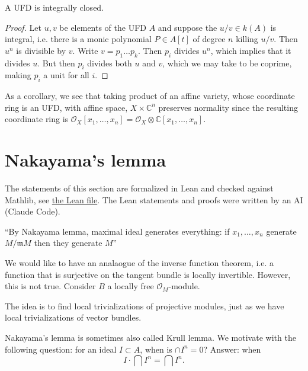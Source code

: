 \begin{proposition}
\label{proposition-ufd-integrally-closed}
A UFD is integrally closed.
\end{proposition}

\begin{proof}
Let $u,v$ be elements of the UFD $A$
and suppose the $u/v \in k(A)$ is integral,
i.e. there is a monic polynomial
$P \in A[t]$ of degree $n$ killing $u/v$.
Then $u^n$ is divisible by $v$.
Write $v=p_1…p_k$.
Then $p_i$ divides $u^n$,
which implies that it divides $u$.
But then $p_i$ divides both $u$ and $v$,
which we may take to be coprime, making
$p_i$ a unit for all $i$.
\end{proof}


\noindent
As a corollary, we see that taking product of
an affine variety, whose coordinate ring is
an UFD, with affine space, $X \times
\mathbb{C}^n$ preserves normality since the
resulting coordinate ring is
$\mathcal{O}_X[x_1,…,x_n]=\mathcal{O}_X
\otimes \mathbb{C}[x_1,…,x_n]$.

\section{Nakayama's lemma}
\label{section-nakayama}

\noindent
The statements of this section
are formalized in Lean and checked
against Mathlib, see
\href{https://github.com/danimalabares/%
heap-project/blob/main/lean/HeapProject/%
CommutativeAlgebra/Nakayama.lean}
{the Lean file}.
The Lean statements and proofs
were written by an AI (Claude Code).

\medskip

\noindent
``By Nakayama lemma,
maximal ideal generates everything:
if $x_1,…,x_n$ generate $M/\mathfrak{m} M$
then they generate $M$''

\medskip\noindent
We would like to have an analaogue of
the inverse function theorem,
i.e. a function that is surjective
on the tangent bundle is locally invertible.
However, this is not true.
Consider $B$ a locally free
$\mathcal{O}_M$-module.

The idea is to find local trivializations
of projective modules,
just as we have local trivializations
of vector bundles.

\medskip\noindent
Nakayama's lemma is sometimes
also called Krull lemma.
We motivate with the following question:
for an ideal $I \subset A$,
when is $\cap I^n=0$?
Answer: when
$$
I\cdot \bigcap I^n = \bigcap I^n.
$$

